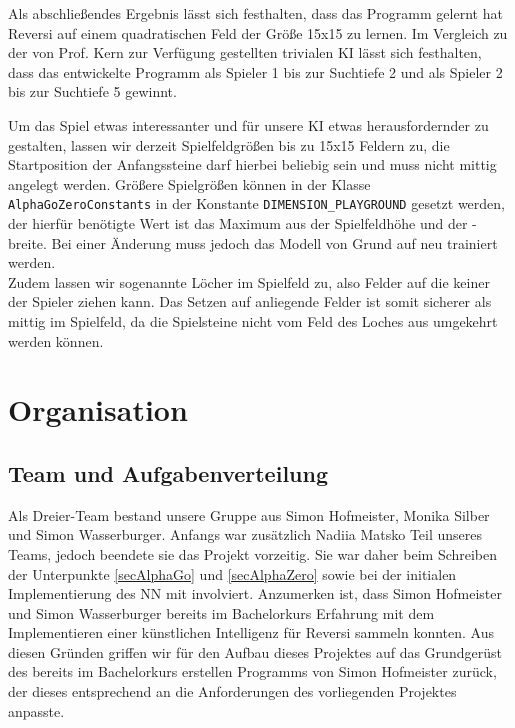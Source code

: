 \documentclass[12pt,a4paper]{article}
\begin{document}
Als abschließendes Ergebnis lässt sich festhalten, dass das Programm gelernt hat Reversi auf einem quadratischen Feld der Größe 15x15 zu lernen. Im Vergleich zu der von Prof. Kern zur Verfügung gestellten trivialen KI lässt sich festhalten, dass das entwickelte Programm als Spieler 1 bis zur Suchtiefe 2 und als Spieler 2 bis zur Suchtiefe 5 gewinnt.

Um das Spiel etwas interessanter und f\"{u}r unsere KI etwas herausfordernder zu gestalten, lassen wir derzeit Spielfeldgr\"{o}\ss en bis zu 15x15 Feldern zu, die Startposition der Anfangssteine darf hierbei beliebig sein und muss nicht mittig angelegt werden. Gr\"{o}\ss ere Spielgr\"{o}\ss en k\"{o}nnen in der Klasse \texttt{AlphaGoZeroConstants} in der Konstante \texttt{DIMENSION\_PLAYGROUND} gesetzt werden, der hierf\"{u}r ben\"{o}tigte Wert ist das Maximum aus der Spielfeldh\"{o}he und der -breite. Bei einer \"{A}nderung muss jedoch das Modell von Grund auf neu trainiert werden.\\
Zudem lassen wir sogenannte L\"{o}cher im Spielfeld zu, also Felder auf die keiner der Spieler ziehen kann. Das Setzen auf anliegende Felder ist somit sicherer als mittig im Spielfeld, da die Spielsteine nicht vom Feld des Loches aus umgekehrt werden k\"{o}nnen.


\newpage

\section{Organisation}

\subsection{Team und Aufgabenverteilung}

Als Dreier-Team bestand unsere Gruppe aus Simon Hofmeister, Monika Silber und Simon Wasserburger. Anfangs war zusätzlich Nadiia Matsko Teil unseres Teams, jedoch beendete sie das Projekt vorzeitig. Sie war daher beim Schreiben der Unterpunkte  \ref{secAlphaGo} und \ref{secAlphaZero} sowie bei der initialen Implementierung des NN mit involviert. Anzumerken ist, dass Simon Hofmeister und Simon Wasserburger bereits im Bachelorkurs Erfahrung mit dem Implementieren einer künstlichen Intelligenz für Reversi sammeln konnten. Aus diesen Gründen griffen wir für den Aufbau dieses Projektes auf das Grundgerüst des bereits im Bachelorkurs erstellen Programms von Simon Hofmeister zurück, der dieses entsprechend an die Anforderungen des vorliegenden Projektes anpasste.
\end{document}
